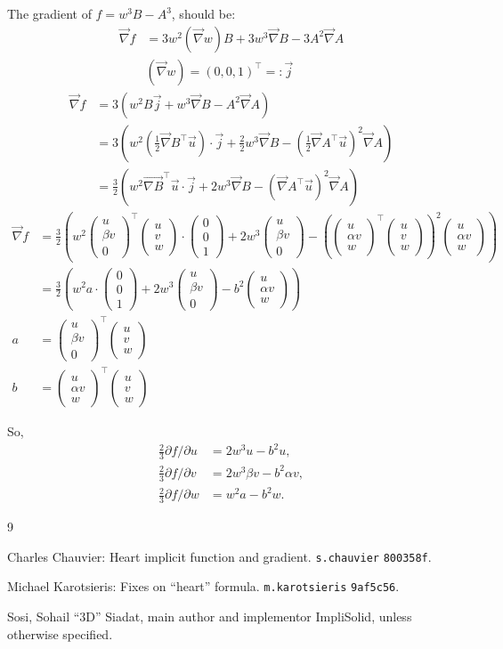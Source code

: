 \documentclass{article}
\begin{document}
The gradient of $f=w^3 B-A^3$, should be:
\begin{align}
  \vec{\nabla} f  &= 3 w^2 \left(\vec{\nabla}w\right) B + 3 w^3 \vec{\nabla} B - 3 A^2 \vec{\nabla} A
  \\
  & \left(\vec{\nabla}w\right) =  \left( 0, 0, 1 \right)^\top =: \vec{j}
\end{align}
\def\vvv#1#2#3{{\begin{pmatrix} #1\\#2\\#3\end{pmatrix}}}
\begin{align}
  \vec{\nabla} f  &= 3 \left( w^2 B  \vec{j} + w^3 \vec{\nabla} B - A^2 \vec{\nabla} A \right)
  \\
       &= 3 \left( w^2  \left( \tfrac12 \vec{\nabla} B  ^\top   \vec{u} \right) \cdot \vec{j}
       + \tfrac22 w^3 \vec{\nabla} B
       - \left(
        \tfrac12 \vec{\nabla} A  ^\top  \vec{u}
       \right)^2 \vec{\nabla} A \right)
  \\
       &= \frac32 \left( w^2  \vec{\nabla B}  ^\top   \vec{u}  \cdot \vec{j}
       +  2 w^3 \vec{\nabla} B
       - \left(
         \vec{\nabla} A  ^\top  \vec{u}
       \right)^2 \vec{\nabla} A \right)
\end{align}
\begin{align}
  \vec{\nabla} f
    &= \frac32 \left( w^2  \vvv{u}{\beta v}{0} ^\top    \vvv{u}{v}{w}  \cdot \vvv{0}{0}{1}
    +  2 w^3 \vvv{u}{\beta v}{0}
    - \left(
      \vvv{u}{\alpha v}{w}   ^\top   \vvv{u}{v}{w}
    \right)^2 \vvv{u}{\alpha v}{w} \right)
    \\
    &= \frac32 \left( w^2 a  \cdot \vvv{0}{0}{1}
    +  2 w^3 \vvv{u}{\beta v}{0}
    - b^2 \vvv{u}{\alpha v}{w} \right)
    \\
    a &=  \vvv{u}{\beta v}{0} ^\top    \vvv{u}{v}{w}
    \\
    b &=  \vvv{u}{\alpha v}{w}   ^\top   \vvv{u}{v}{w}
\end{align}

So,
\begin{align}
  \tfrac23
  {\partial f}/{\partial u}
    &=
    2 w^3 u - b^2 u
    ,
  \\
  \tfrac23
  {\partial f}/{\partial v}
    &=
    2 w^3 \beta v - b^2 \alpha v
    ,
  \\
  \tfrac23
  {\partial f}/{\partial w}
    &=
    w^2 a - b^2 w
    .
\end{align}




\tableofcontents


\begin{thebibliography}{9}

Charles Chauvier:
Heart implicit function and gradient.
\texttt{s.chauvier} \texttt{800358f}.

Michael Karotsieris:
Fixes on ``heart'' formula.
\texttt{m.karotsieris} \texttt{9af5c56}.


 Sosi, Sohail ``3D'' Siadat,
main author and implementor ImpliSolid,
unless otherwise specified.

\end{thebibliography}
\end{document}
